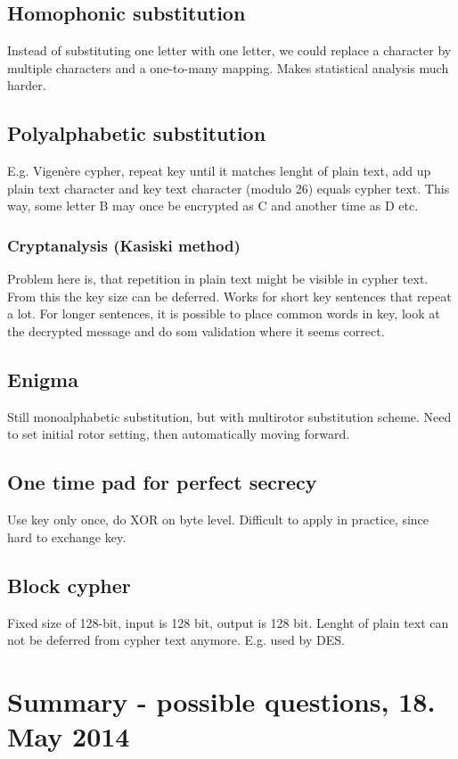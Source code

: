\documentclass[11pt]{article}
\begin{document}
\subsection{Homophonic substitution}
Instead of substituting one letter with one letter, we could replace a character by multiple
characters and a one-to-many mapping. Makes statistical analysis much harder.
\subsection{Polyalphabetic substitution}
E.g. Vigenère cypher, repeat key until it matches lenght of plain text, add up plain text
character and key text character (modulo 26) equals cypher text. This way, some letter B
may once be encrypted as C and another time as D etc.

\subsubsection{Cryptanalysis (Kasiski method)}
Problem here is, that repetition in plain text might be visible in cypher text. From this
the key size can be deferred. Works for short key sentences that repeat a lot. For longer
sentences, it is possible to place common words in key, look at the decrypted message and do
som validation where it seems correct.
\subsection{Enigma}
Still monoalphabetic substitution, but with multirotor substitution scheme. Need to set initial
rotor setting, then automatically moving forward. 

\subsection{One time pad for perfect secrecy}
Use key only once, do XOR on byte level. Difficult to apply in practice, since hard to exchange
key. 
\subsection{Block cypher}
Fixed size of 128-bit, input is 128 bit, output is 128 bit. Lenght of plain text can not be
deferred from cypher text anymore. E.g. used by DES.

\section{Summary - possible questions, 18. May 2014 }
\end{document}

